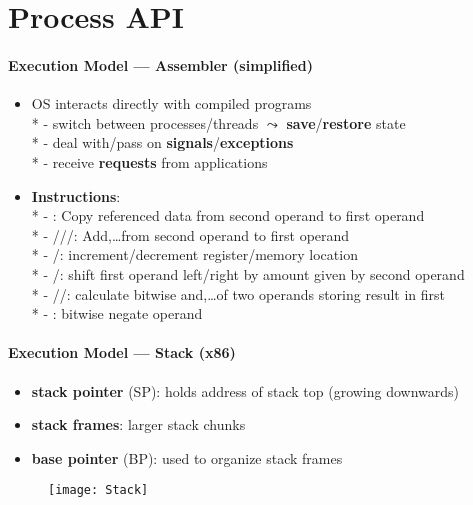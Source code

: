 \section{Process API}

\paragraph{Execution Model --- Assembler (simplified)}
\begin{itemize}
  \item OS interacts directly with compiled programs \\*
    - switch between processes/threads \( \leadsto \) \textbf{save}/\textbf{restore} state \\*
    - deal with/pass on \textbf{signals}/\textbf{exceptions} \\*
    - receive \textbf{requests} from applications
  \item \textbf{Instructions}: \\*
    - : Copy referenced data from second operand to first operand \\*
    - ///: Add,\dots from second operand to first operand \\*
    - /: increment/decrement register/memory location \\*
    - /: shift first operand left/right by amount given by second operand \\*
    - //: calculate bitwise and,\dots of two operands storing result in first \\*
    - : bitwise negate operand
\end{itemize}

\paragraph{Execution Model --- Stack (x86)}
\begin{itemize}
  \item \textbf{stack pointer} (SP): holds address of stack top (growing downwards)
  \item \textbf{stack frames}: larger stack chunks
  \item \textbf{base pointer} (BP): used to organize stack frames
\end{itemize}

\begin{figure}[h]\centering\label{Stack}\texttt{[image: Stack]}\end{figure}


